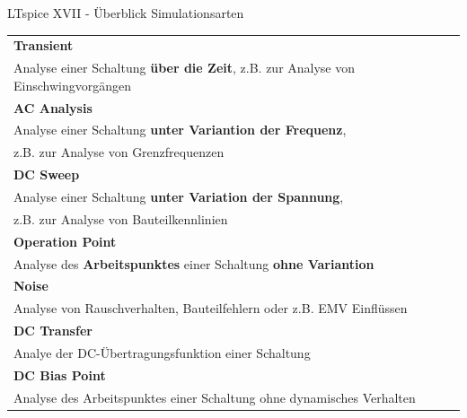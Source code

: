 \documentclass{beamer}
\begin{document}
  \begin{frame}{LTspice XVII - Überblick Simulationsarten}

    \begin{scriptsize}
    \begin{tabular}{ l }
      \hline
      \textbf{Transient}\\
      Analyse einer Schaltung \textbf{über die Zeit}, z.B. zur Analyse von Einschwingvorgängen\\
      \hline
      \textbf{AC Analysis}\\
      Analyse einer Schaltung \textbf{unter Variantion der Frequenz},\\ z.B. zur Analyse von Grenzfrequenzen\\
      \hline
      \textbf{DC Sweep}\\
      Analyse einer Schaltung \textbf{unter Variation der Spannung},\\ z.B. zur Analyse von Bauteilkennlinien\\
      \hline
      \textbf{Operation Point}\\
      Analyse des \textbf{Arbeitspunktes} einer Schaltung \textbf{ohne Variantion}\\
      \hline
      \textbf{Noise}\\
      Analyse von Rauschverhalten, Bauteilfehlern oder z.B. EMV Einflüssen\\
      \hline
      \textbf{DC Transfer}\\
      Analye der DC-Übertragungsfunktion einer Schaltung\\
      \hline
      \textbf{DC Bias Point}\\
      Analyse des Arbeitspunktes einer Schaltung ohne dynamisches Verhalten\\
      \hline
    \end{tabular}
    \end{scriptsize} 
    
  \end{frame}
  
\end{document}
